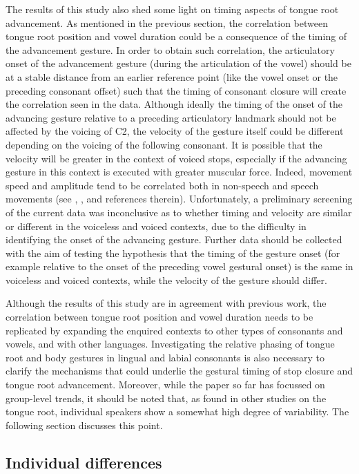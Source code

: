 \documentclass[preprint]{JASAnew}
\begin{document}
The results of this study also shed some light on timing aspects of
tongue root advancement. As mentioned in the previous section, the
correlation between tongue root position and vowel duration could be a
consequence of the timing of the advancement gesture. In order to obtain
such correlation, the articulatory onset of the advancement gesture
(during the articulation of the vowel) should be at a stable distance
from an earlier reference point (like the vowel onset or the preceding
consonant offset) such that the timing of consonant closure will create
the correlation seen in the data. Although ideally the timing of the
onset of the advancing gesture relative to a preceding articulatory
landmark should not be affected by the voicing of C2, the velocity of
the gesture itself could be different depending on the voicing of the
following consonant. It is possible that the velocity will be greater in
the context of voiced stops, especially if the advancing gesture in this
context is executed with greater muscular force. Indeed, movement speed
and amplitude tend to be correlated both in non-speech and speech
movements (see \citealt{lofqvist1994}, \citealt{kuberski2019}, and
references therein). Unfortunately, a preliminary screening of the
current data was inconclusive as to whether timing and velocity are
similar or different in the voiceless and voiced contexts, due to the
difficulty in identifying the onset of the advancing gesture. Further
data should be collected with the aim of testing the hypothesis that the
timing of the gesture onset (for example relative to the onset of the
preceding vowel gestural onset) is the same in voiceless and voiced
contexts, while the velocity of the gesture should differ.

Although the results of this study are in agreement with previous work,
the correlation between tongue root position and vowel duration needs to
be replicated by expanding the enquired contexts to other types of
consonants and vowels, and with other languages. Investigating the
relative phasing of tongue root and body gestures in lingual and labial
consonants is also necessary to clarify the mechanisms that could
underlie the gestural timing of stop closure and tongue root
advancement. Moreover, while the paper so far has focussed on
group-level trends, it should be noted that, as found in other studies
on the tongue root, individual speakers show a somewhat high degree of
variability. The following section discusses this point.

\hypertarget{individual-differences}{%
\subsection{Individual differences}\label{individual-differences}}
\end{document}
